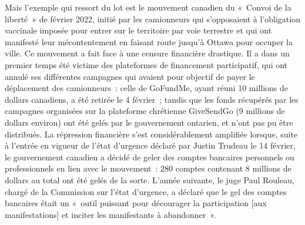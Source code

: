 Mais l'exemple qui ressort du lot est le mouvement canadien du «~Convoi de la liberté~» de février 2022, initié par les camionneurs qui s'opposaient à l'obligation vaccinale imposée pour entrer sur le territoire par voie terrestre et qui ont manifesté leur mécontentement en faisant route jusqu'à Ottawa pour occuper la ville. Ce mouvement a fait face à une censure financière drastique. Il a dans un premier temps été victime des plateformes de financement participatif, qui ont annulé ses différentes campagnes qui avaient pour objectif de payer le déplacement des camionneurs~: celle de GoFundMe, ayant réuni 10 millions de dollars canadiens, a été retirée le 4 février~; tandis que les fonds récupérés par les campagnes organisées sur la plateforme chrétienne GiveSendGo (9 millions de dollars environ) ont été gelés par le gouvernement ontarien, et n'ont pas pu être distribués. La répression financière s'est considérablement amplifiée lorsque, suite à l'entrée en vigueur de l'état d'urgence déclaré par Justin Trudeau le 14 février, le gouvernement canadien a décidé de geler des comptes bancaires personnels ou professionnels en lien avec le mouvement~: 280 comptes contenant 8 millions de dollars au total ont été gelés de la sorte. L'année suivante, le juge Paul Rouleau, chargé de la Commission sur l'état d'urgence, a déclaré que le gel des comptes bancaires était un «~outil puissant pour décourager la participation [aux manifestations] et inciter les manifestants à abandonner~». %

